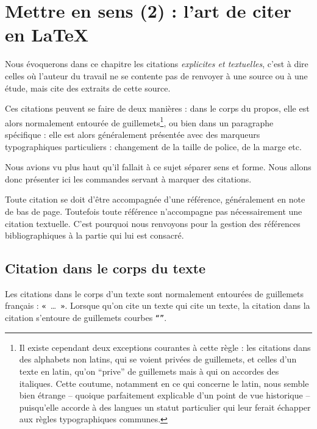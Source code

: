 \chapter{Mettre en sens (2) : l'art de citer en LaTeX}\label{citertexte}


Nous évoquerons dans ce chapitre les citations \emph{explicites et textuelles}, c'est à dire celles où l'auteur du travail ne se contente pas de renvoyer à une source ou à une étude, mais cite des extraits de cette source.

Ces citations peuvent se faire de deux manières : dans le corps du propos, elle est alors normalement entourée de guillemets\footnote{Il existe cependant deux exceptions courantes à cette règle : les citations dans des alphabets non latins, qui se voient privées de guillemets, et celles d'un texte en latin, qu'on \enquote{prive} de guillemets mais à qui on accordes des italiques. Cette coutume, notamment en ce qui concerne le latin, nous semble bien étrange -- quoique parfaitement explicable d'un point de vue historique -- puisqu'elle accorde à des langues un statut particulier qui leur ferait échapper aux règles typographiques communes.}, ou bien dans un paragraphe spécifique : elle est alors généralement présentée avec des marqueurs typographiques particuliers : changement de la taille de police, de la marge etc.

Nous avions vu plus haut qu'il fallait à ce sujet séparer sens et forme. Nous allons donc présenter ici les commandes servant à marquer des citations.

\begin{attention}
Toute citation se doit d'être accompagnée d'une référence, généralement en note de bas de page. Toutefois toute référence n'accompagne pas nécessairement une citation textuelle. C'est pourquoi nous renvoyons pour la gestion des références bibliographiques à la partie qui lui est consacré.

\end{attention}

\section{Citation dans le corps du texte}\label{guillemets}

Les citations dans le corps d'un texte sont normalement entourées de guillemets français : \verb|« |\ldots \verb| »|. Lorsque qu'on cite un texte qui cite un texte, la citation dans la citation s'entoure de guillemets courbes \verb|“”|. 

